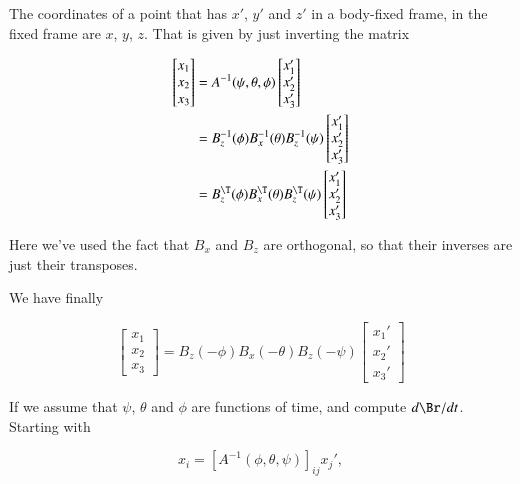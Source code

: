 The coordinates of a point that has $x'$, $y'$ and $z'$ in a body-fixed frame, in the fixed frame are $x$, $y$, $z$.  That is given by just inverting the matrix

\begin{align*}
\begin{bmatrix}
x_1 \\
x_2 \\
x_3
\end{bmatrix}
&=
A^{-1}(\psi, \theta, \phi)
\begin{bmatrix}
x_1' \\
x_2' \\
x_3'
\end{bmatrix} \\
&=
B_z^{-1}(\phi)
B_x^{-1}(\theta)
B_z^{-1}(\psi)
\begin{bmatrix}
x_1' \\
x_2' \\
x_3'
\end{bmatrix} \\
&=
B_z^{\T}(\phi)
B_x^{\T}(\theta)
B_z^{\T}(\psi)
\begin{bmatrix}
x_1' \\
x_2' \\
x_3'
\end{bmatrix}
\end{align*}

Here we've used the fact that $B_x$ and $B_z$ are orthogonal, so that their inverses are just their transposes.

We have finally

\begin{equation}\label{eqn:classicalMechanicsEulerAngles:280}
\begin{bmatrix}
x_1 \\
x_2 \\
x_3
\end{bmatrix}
=
B_z(-\phi)
B_x(-\theta)
B_z(-\psi)
\begin{bmatrix}
x_1' \\
x_2' \\
x_3'
\end{bmatrix} 
\end{equation}

If we assume that $\psi$, $\theta$ and $\phi$ are functions of time, and compute $d \Br/dt$.  Starting with

\begin{equation}\label{eqn:classicalMechanicsEulerAngles:300}
x_i = [A^{-1}(\phi, \theta, \psi)]_{ij} x_j',
\end{equation}


